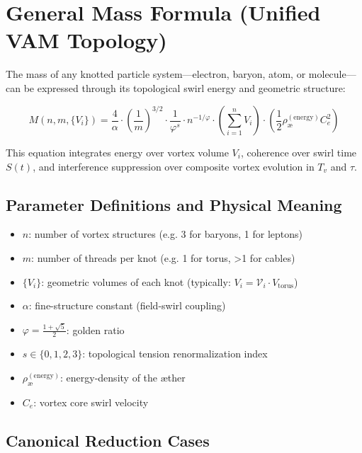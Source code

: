 \section{General Mass Formula (Unified VAM Topology)}\label{sec:master-mass-formula}

The mass of any knotted particle system—electron, baryon, atom, or molecule—can be expressed through its topological swirl energy and geometric structure:

\[
\boxed{
M(n, m, \{V_i\}) = \frac{4}{\alpha} \cdot \left( \frac{1}{m} \right)^{3/2} \cdot \frac{1}{\varphi^s} \cdot n^{-1/\varphi} \cdot \left( \sum_{i=1}^n V_i \right) \cdot \left( \frac{1}{2} \rho_\text{\ae}^{(\text{energy})} C_e^2 \right)
}
\]

This equation integrates energy over vortex volume $V_i$, coherence over swirl time $S(t)$, and interference suppression over composite vortex evolution in $T_v$ and $\tau$.

\subsection{Parameter Definitions and Physical Meaning}

\begin{itemize}
  \item \( n \): number of vortex structures (e.g. 3 for baryons, 1 for leptons)
  \item \( m \): number of threads per knot (e.g. 1 for torus, >1 for cables)
  \item \( \{V_i\} \): geometric volumes of each knot (typically: \( V_i = \mathcal{V}_i \cdot V_{\text{torus}} \))
  \item \( \alpha \): fine-structure constant (field-swirl coupling)
  \item \( \varphi = \frac{1+\sqrt{5}}{2} \): golden ratio
  \item \( s \in \{0, 1, 2, 3\} \): topological tension renormalization index
  \item \( \rho_\text{\ae}^{(\text{energy})} \): energy-density of the æther
  \item \( C_e \): vortex core swirl velocity
\end{itemize}

\subsection{Canonical Reduction Cases}

